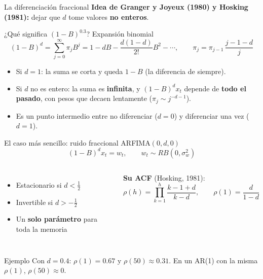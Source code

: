 \documentclass[aspectratio=169,11pt]{beamer}
\newcommand{\destacar}[1]{\textcolor{udeaverde}{\textbf{#1}}}
\begin{document}
\begin{frame}{La diferenciación fraccional}
\textbf{Idea de Granger y Joyeux (1980) y Hosking (1981):} dejar que $d$ tome valores \destacar{no enteros}.
\vspace{0.3cm}
\begin{block}{¿Qué significa $(1-B)^{0.3}$? Expansión binomial}
\[
(1-B)^{d} = \sum_{j=0}^{\infty}\pi_j B^{j} = 1 - dB - \frac{d(1-d)}{2!}B^{2} - \cdots,
\qquad \pi_j = \pi_{j-1}\,\frac{j-1-d}{j}
\]
\end{block}
\begin{itemize}
\item Si $d=1$: la suma se corta y queda $1-B$ (la diferencia de siempre).
\item Si $d$ no es entero: la suma es \destacar{infinita}, y $(1-B)^d x_t$ depende de \textbf{todo el pasado}, con pesos que decaen lentamente ($\pi_j \sim j^{-d-1}$).
\item Es un punto intermedio entre no diferenciar ($d=0$) y diferenciar una vez ($d=1$).
\end{itemize}
\end{frame}

\begin{frame}{El caso más sencillo: ruido fraccional ARFIMA$(0,d,0)$}
\[
(1-B)^{d}x_t = w_t, \qquad w_t \sim RB(0,\sigma_w^2)
\]
\begin{columns}[T]
\begin{itemize}
\item Estacionario si $d < \tfrac12$
\item Invertible si $d > -\tfrac12$
\item Un \destacar{solo parámetro} para toda la memoria
\end{itemize}
\textbf{Su ACF} (Hosking, 1981):
\[
\rho(h) = \prod_{k=1}^{h}\frac{k-1+d}{k-d}, \qquad \rho(1) = \frac{d}{1-d}
\]
\end{columns}
\vspace{0.2cm}
\begin{block}{Ejemplo}
Con $d = 0.4$: $\rho(1) = 0.67$ y $\rho(50) \approx 0.31$. En un AR(1) con la misma $\rho(1)$, $\rho(50) \approx 0$.
\end{block}
\end{frame}
\end{document}
